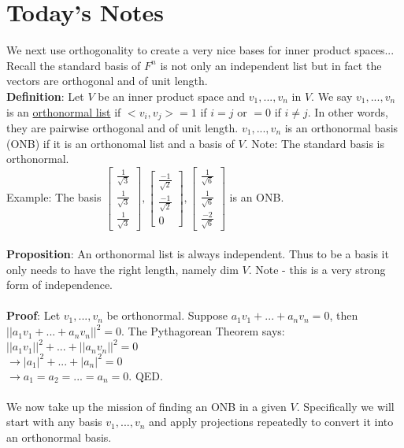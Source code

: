 \documentclass{article}
\begin{document}
\section{Today's Notes}
We next use orthogonality to create a very nice bases for inner product spaces... Recall the standard basis of $F^n$ is not only an independent list but in fact the vectors are orthogonal and of unit length. \\
\textbf{Definition}: Let $V$ be an inner product space and $v_1,...,v_n$ in $V$. We say $v_1,...,v_n$ is an \underline{orthonormal list} if $<v_i, v_j> = 1$ if $i = j$ or $ = 0$ if $i \neq j$.  In other words, they are pairwise orthogonal and of unit length. $v_1,...,v_n$ is an orthonormal basis (ONB) if it is an orthonomal list and a basis of $V$. Note: The standard basis is orthonormal. \\
Example: The basis $\begin{bmatrix} 
\frac{1}{\sqrt{3}}\\\frac{1}{\sqrt{3}}\\\frac{1}{\sqrt{3}}
\end{bmatrix}, \begin{bmatrix}
    \frac{-1}{\sqrt{2}}\\\frac{-1}{\sqrt{2}}\\0
\end{bmatrix}, \begin{bmatrix}
    \frac{1}{\sqrt{6}}\\\frac{1}{\sqrt{6}}\\\frac{-2}{\sqrt{6}}
\end{bmatrix}$ is an ONB. \\\\
\textbf{Proposition}: An orthonormal list is always independent. Thus to be a basis it only needs to have the right length, namely dim $V$. Note - this is a very strong form of independence. \\\\
\textbf{Proof}: Let $v_1,...,v_n$ be orthonormal. Suppose $a_1v_1 + ... + a_nv_n = 0$, then $||a_1v_1 + ... + a_nv_n||^2 = 0$. The Pythagorean Theorem says: $||a_1v_1||^2 + ... + ||a_nv_n||^2 = 0$\\
$ \rightarrow |a_1|^2 + ... + |a_n|^2 = 0 $\\
$\rightarrow a_1 = a_2 = ... = a_n = 0$. QED. \\\\
We now take up the mission of finding an ONB in a given $V$. Specifically we will start with any basis $v_1,...,v_n$ and apply projections repeatedly to convert it into an orthonormal basis. \\\\
\end{document}
